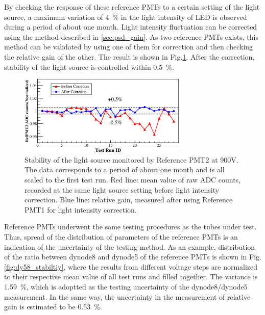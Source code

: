 \documentclass[5p, times]{elsarticle}
\begin{document}
By checking the response of these reference PMTs to a certain setting of the light source, a maximum variation of \SI{4}{\percent} in the light intensity of LED is observed during a period of about one month.
Light intensity fluctuation can be corrected using the method described in \ref{sec:psd_gain}.
As two reference PMTs exists, this method can be validated by using one of them for correction and then checking the relative gain of the other. 
The result is shown in Fig.\ref{fig:led_stability}.
After the correction, stability of the light source is controlled within \textpm\SI{0.5}{\percent}.

\begin{figure}
 \centering
 \includegraphics[width=80mm]{led_stability}
\caption{Stability of the light source monitored by Reference PMT2 at 900V.
The data corresponds to a period of about one month and is all scaled to the first test run.
Red line: mean value of raw ADC counts, recorded at the same light source setting before light intensity correction.
Blue line: relative gain, measured after using Reference PMT1 for light intensity correction.}
\label{fig:led_stability}
\end{figure} 

Reference PMTs underwent the same testing procedures as the tubes under test.
Thus, spread of the distribution of parameters of the reference PMTs is an indication of the uncertainty of the testing method.
As an example, distribution of the ratio between dynode8 and dynode5 of the reference PMTs is shown in Fig.\ref{fig:dy58_stabiltiy}, where the results from different voltage steps are normalized to their respective mean value of all test runs and filled together.
The variance is \SI{1.59}{\percent}, which is adoptted as the testing uncertainty of the dynode8/dynode5 measurement.
In the same way, the uncertainty in the measurement of relative gain is estimated to be \SI{0.53}{\percent}. 
\end{document}
